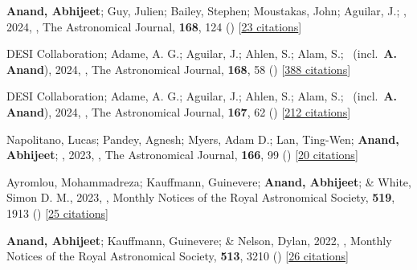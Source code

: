 \item[{\color{numcolor}\scriptsize8}] \textbf{Anand, Abhijeet}; Guy, Julien; Bailey, Stephen; Moustakas, John; Aguilar, J.; \etal, 2024, , The Astronomical Journal, \textbf{168}, 124 () [\href{https://ui.adsabs.harvard.edu/abs/2024AJ....168..124A}{23 citations}]

\item[{\color{numcolor}\scriptsize7}] DESI Collaboration; Adame, A. G.; Aguilar, J.; Ahlen, S.; Alam, S.; \etal\ (incl.\ \textbf{A. Anand}), 2024, , The Astronomical Journal, \textbf{168}, 58 () [\href{https://ui.adsabs.harvard.edu/abs/2024AJ....168...58D}{388 citations}]

\item[{\color{numcolor}\scriptsize6}] DESI Collaboration; Adame, A. G.; Aguilar, J.; Ahlen, S.; Alam, S.; \etal\ (incl.\ \textbf{A. Anand}), 2024, , The Astronomical Journal, \textbf{167}, 62 () [\href{https://ui.adsabs.harvard.edu/abs/2024AJ....167...62D}{212 citations}]

\item[{\color{numcolor}\scriptsize5}] Napolitano, Lucas; Pandey, Agnesh; Myers, Adam D.; Lan, Ting-Wen; \textbf{Anand, Abhijeet}; \etal, 2023, , The Astronomical Journal, \textbf{166}, 99 () [\href{https://ui.adsabs.harvard.edu/abs/2023AJ....166...99N}{20 citations}]

\item[{\color{numcolor}\scriptsize4}] Ayromlou, Mohammadreza; Kauffmann, Guinevere; \textbf{Anand, Abhijeet}; \& White, Simon D. M., 2023, , Monthly Notices of the Royal Astronomical Society, \textbf{519}, 1913 () [\href{https://ui.adsabs.harvard.edu/abs/2023MNRAS.519.1913A}{25 citations}]

\item[{\color{numcolor}\scriptsize3}] \textbf{Anand, Abhijeet}; Kauffmann, Guinevere; \& Nelson, Dylan, 2022, , Monthly Notices of the Royal Astronomical Society, \textbf{513}, 3210 () [\href{https://ui.adsabs.harvard.edu/abs/2022MNRAS.513.3210A}{26 citations}]

